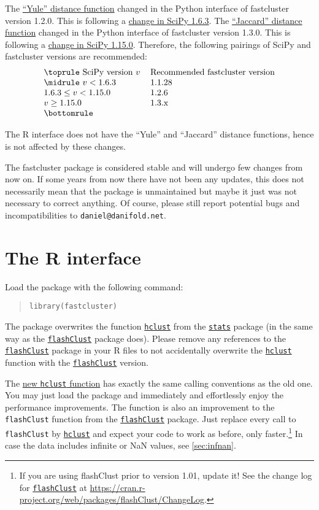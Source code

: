\documentclass[fontsize=10pt,paper=letter,BCOR=-6mm,DIV=8]{scrartcl}
\newcommand*\q{\textquotesingle}
\newcommand*\hclust{\href{https://stat.ethz.ch/R-manual/R-patched/library/stats/html/hclust.html}{\texttt{hclust}}}
\newcommand*\stats{\href{https://stat.ethz.ch/R-manual/R-patched/library/stats/html/00Index.html}{\texttt{stats}}}
\newcommand*\flashClustPack{\href{https://CRAN.R-project.org/package=flashClust}{\texttt{flashClust}}}
\begin{document}
The \hyperref[yule]{“Yule” distance function} changed in the Python interface of fastcluster version 1.2.0. This is following a \href{https://github.com/scipy/scipy/commit/3b22d1da98dc1b5f64bc944c21f398d4ba782bce}{change in SciPy 1.6.3}. The \hyperref[jaccard]{“Jaccard” distance function} changed in the Python interface of fastcluster version 1.3.0. This is following a \href{https://github.com/scipy/scipy/commit/ecf3ff0ff12666cbeaa5c61d5726fd0141657b54}{change in SciPy 1.15.0}. Therefore, the following pairings of SciPy and fastcluster versions are recommended:
\[
\begin{tabular}{ll}\toprule
  SciPy version $v$ & Recommended fastcluster version \\\midrule
  $v<\textrm{1.6.3}$ & 1.1.28 \\
  $\textrm{1.6.3} \leq v < \textrm{1.15.0}$ & 1.2.6 \\
  $v \geq \textrm{1.15.0}$ & 1.3.x\\\bottomrule
\end{tabular}
\]

The R interface does not have the “Yule” and “Jaccard” distance functions, hence is not affected by these changes.

The fastcluster package is considered stable and will undergo few changes from now on. If some years from now there have not been any updates, this does not necessarily mean that the package is unmaintained but maybe it just was not necessary to correct anything. Of course, please still report potential bugs and incompatibilities to \texttt{daniel@danifold.net}.

\tableofcontents

\section{The R interface}

Load the package with the following command:
\begin{quote}
  \texttt{library(\q fastcluster\q)}
\end{quote}

The package overwrites the function \hclust{} from the \stats{} package (in the same
way as the \flashClustPack{} package does). Please remove any references to the
\flashClustPack{} package in your R files to not accidentally overwrite the \hclust{}
function with the \flashClustPack{} version.

The \hyperref[hclust]{new \texttt{hclust} function} has exactly the same calling conventions as the old one. You may just load the package and immediately and effortlessly enjoy the performance improvements. The function is also an improvement to the \texttt{flashClust} function from the \flashClustPack{} package. Just replace every call to \texttt{flashClust} by \hyperref[hclust]{\texttt{hclust}} and expect your code to work as before, only faster.\footnote{If you are using flashClust prior to version 1.01, update it! See the change log for \flashClustPack{} at \url{https://cran.r-project.org/web/packages/flashClust/ChangeLog}.} In case the data includes infinite or NaN values, see \autoref{sec:infnan}.
\end{document}
